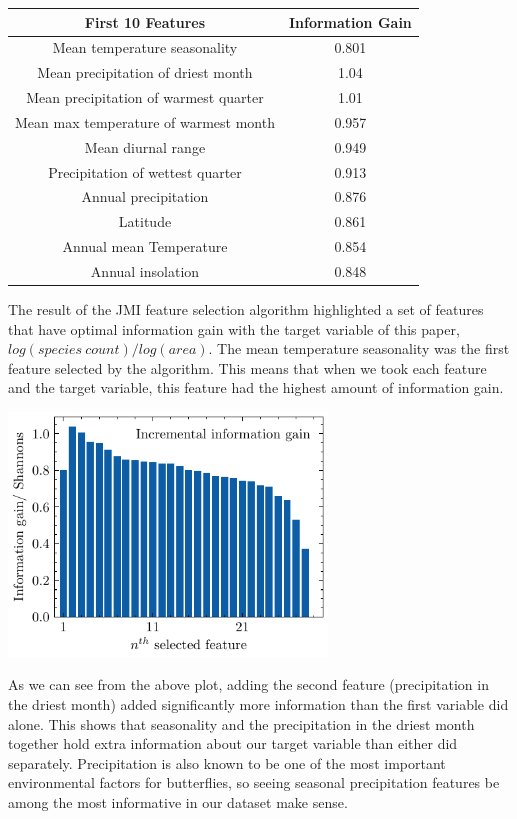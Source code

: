 \documentclass[prl,showpacs,superscriptaddress,twocolumn,longbibliography]{revtex4-1}
\begin{document}
\begin{center}\begin{tabular}{||c c||}
 \hline
First 10 Features & Information Gain \\
 \hline\hline
 Mean temperature seasonality & 0.801\\ 
 \hline
 Mean precipitation of driest month & 1.04\\
  \hline
 Mean precipitation of warmest quarter &  1.01\\
 \hline
 Mean max temperature of warmest month &  0.957\\
 \hline
 Mean diurnal range & 0.949\\
 \hline
 Precipitation of wettest quarter & 0.913\\
 \hline
 Annual precipitation & 0.876\\
 \hline
 Latitude & 0.861\\
 \hline
 Annual mean Temperature & 0.854\\
 \hline 
 Annual insolation & 0.848\\ [1ex]
 \hline
\end{tabular}
\end{center}

The result of the JMI feature selection algorithm highlighted a set of features that have optimal information gain with the target variable of this paper, $log(species \: count)/log(area)$. The mean temperature seasonality was the first feature selected by the algorithm. This means that when we took each feature and the target variable, this feature had the highest amount of information gain. 

\begin{center}\includegraphics[width=240pt]{Features.pdf}\end{center}

As we can see from the above plot, adding the second feature (precipitation in the driest month) added significantly more information than the first variable did alone. This shows that seasonality and the precipitation in the driest month together hold extra information about our target variable than either did separately. Precipitation is also known to be one of the most important environmental factors for butterflies\cite{m_environmental_2021}, so seeing seasonal precipitation features be among the most informative in our dataset make sense.
\end{document}
